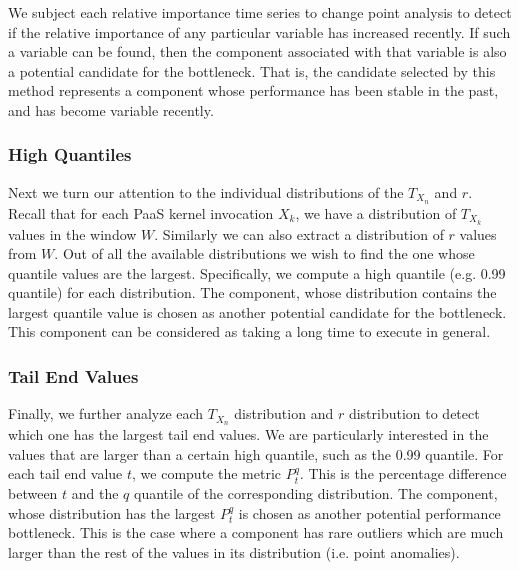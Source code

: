 We subject each relative importance time series to change point analysis to detect if the relative importance of any particular
variable has increased recently. If such a variable can be found, then the component
associated with that variable is also a potential candidate for the bottleneck. 
That is, the candidate selected by this method represents
a component whose performance has been stable in the past, and has become variable recently. 

\subsubsection{High Quantiles}
\label{sec:highquantile}
Next we turn our attention to the individual distributions of the $T_{X_n}$ and $r$. 
Recall that for each PaaS kernel invocation
$X_k$, we have a distribution of $T_{X_k}$ values in the window $W$. Similarly we
can also extract a distribution of $r$ values from $W$. Out of all the available distributions
we wish to find the one whose quantile values are the largest.
Specifically, we compute a high
quantile (e.g. 0.99 quantile) for each distribution. The component, whose distribution 
contains the largest quantile value
is chosen as another potential candidate for the bottleneck. This component can be considered
as taking a long time to execute in general.

\subsubsection{Tail End Values}
\label{sec:tailend}
Finally, we further analyze each $T_{X_n}$ distribution and $r$ distribution to detect which one has the largest tail end values.
We are particularly interested in the values that are larger than a certain high quantile, such as the 0.99 quantile.
For each tail end value $t$, we compute the metric $P^q_t$. This is the percentage difference between $t$ and the
$q$ quantile of the corresponding distribution. The component, whose distribution has
the largest $P^q_t$ is chosen as another potential performance bottleneck.
This is the case where a component has rare outliers which are much larger than the rest of 
the values in its distribution (i.e. point anomalies).

